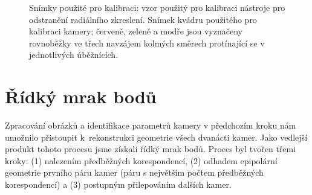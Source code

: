 \documentclass[11pt,oneside,a4paper,pdftex]{article}   %
\begin{document}
		\begin{figure}[htb]
			\centering
			\caption{Snímky použité pro kalibraci:  vzor použitý
				pro kalibraci nástroje pro odstranění radiálního zkreslení.
				 Snímek kvádru použitého pro
				kalibraci kamery; červeně, zeleně a modře jsou vyznačeny rovnoběžky ve třech
				navzájem kolmých směrech protínající se v jednotlivých úběžnících.}
		\end{figure}
	

\section{Řídký mrak bodů}

	Zpracování obrázků a identifikace parametrů kamery v předchozím kroku nám umožnilo přistoupit
	k~rekonstrukci geometrie všech dvanácti kamer. Jako vedlejší produkt tohoto procesu jsme získali řídký
	mrak bodů. Proces byl tvořen třemi kroky: (1) nalezením předběžných korespondencí, (2) odhadem
	epipolární geometrie prvního páru kamer (páru s největším počtem předběžných korespondencí) a (3)
	postupným přilepováním dalších kamer.
	
\end{document}
